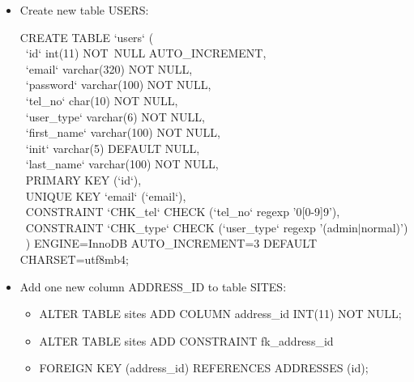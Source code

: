 \documentclass[titlepage]{article}
\begin{document}
\begin{itemize}

\item Create new table USERS: \vspace{1em}

\hspace{15pt}CREATE TABLE `users` ( \\
\-\ \hspace{30pt}`id` int(11) NOT\ NULL AUTO\_INCREMENT, \\
\-\ \hspace{30pt}`email` varchar(320) NOT NULL, \\
\-\ \hspace{30pt}`password` varchar(100) NOT NULL, \\
\-\ \hspace{30pt}`tel\_no` char(10) NOT NULL, \\
\-\ \hspace{30pt}`user\_type` varchar(6) NOT NULL, \\
\-\ \hspace{30pt}`first\_name` varchar(100) NOT NULL, \\
\-\ \hspace{30pt}`init` varchar(5) DEFAULT NULL, \\
\-\ \hspace{30pt}`last\_name` varchar(100) NOT NULL, \\
\-\ \hspace{30pt}PRIMARY KEY (`id`), \\
\-\ \hspace{30pt}UNIQUE KEY `email` (`email`), \\
\-\ \hspace{30pt}CONSTRAINT `CHK\_tel` CHECK (`tel\_no` regexp '0[0-9]{9}'), \\
\-\ \hspace{30pt}CONSTRAINT `CHK\_type` CHECK (`user\_type` regexp '(admin$\vert$normal)') \\
\-\ \hspace{15pt}) ENGINE=InnoDB AUTO\_INCREMENT=3 DEFAULT CHARSET=utf8mb4;

\vspace{1em}

\item Add one new column ADDRESS\_ID to table SITES: \vspace{1em}

\begin{itemize}
  \item ALTER TABLE sites ADD COLUMN address\_id INT(11) NOT NULL;
  \item ALTER TABLE sites ADD CONSTRAINT fk\_address\_id
  \item FOREIGN KEY (address\_id) REFERENCES ADDRESSES (id);
\end{itemize}


\end{itemize}
\end{document}
